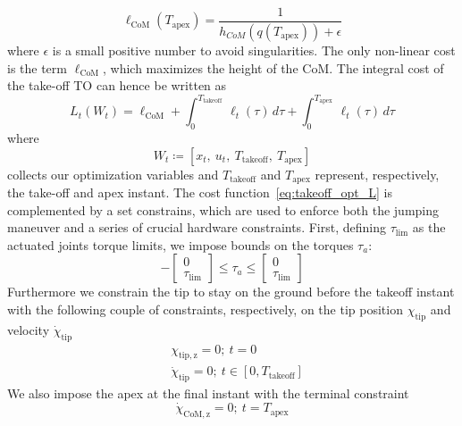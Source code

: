 \begin{equation}\label{eq:max_com}
\ell_{\mathrm{CoM}}(T_{\mathrm{apex}}) = \dfrac{1}{h_{CoM}(q(T_{\mathrm{apex}})) + \epsilon}
\end{equation}
where $\epsilon$ is a small positive number to avoid singularities.
The only non-linear cost is the term $\ell_{\mathrm{CoM}}$, which maximizes the height of the CoM. The integral cost of the take-off TO can hence be written as
\begin{dmath}\label{eq:takeoff_opt_L}
    L_{t} \left( W_t\right) = \ell_{\mathrm{CoM}} + \int_{0}^{T_{\mathrm{takeoff}}}\,\ell_{t}(\tau)\,d\tau + \int_{0}^{T_{\mathrm{apex}}}\,\ell_{t}(\tau)\,d\tau
\end{dmath}
where
\begin{equation}\label{takeoff_opt:opt_vars}
W_t \coloneqq \left[x_t,~u_t,~T_{\mathrm{takeoff}},~T_{\mathrm{apex}}\right]
\end{equation} 
collects our optimization variables and $T_{\mathrm{takeoff}}$ and $T_{\mathrm{apex}}$ represent, respectively, the take-off and apex instant. 
The cost function~\eqref{eq:takeoff_opt_L} is complemented by a set constrains, which are used to  enforce both the jumping maneuver and a series of crucial hardware constraints. First, defining $\tau_{\mathrm{lim}}$ as the actuated joints torque limits, we impose bounds on the torques $\tau_a$:
\begin{equation}\label{eq:tau_lims}
- \begin{bmatrix}
0\\
\tau_{\mathrm{lim}}
\end{bmatrix} \leq \tau_a \leq \begin{bmatrix}
0\\
\tau_{\mathrm{lim}}
\end{bmatrix}
\end{equation}
Furthermore we constrain the tip to stay on the ground before the takeoff instant with the following couple of constraints, respectively, on the tip position $\chi_{\mathrm{tip}}$ and velocity $\dot{\chi}_{\mathrm{tip}}$
\begin{eqnarray}
&\chi_{\mathrm{tip, z}} = 0 \label{eq:tip_on_ground}\label{eq:tip_on_ground_vel};~t = 0\\
&\dot{\chi}_{\mathrm{tip}} = 0;~t\in\left[0, T_{\mathrm{takeoff}}\right]
\end{eqnarray}
We also impose the apex at the final instant with the terminal constraint
\begin{equation}\label{eq:apex_com}
\dot{\chi}_{\mathrm{CoM, z}} = 0;~t = T_{\mathrm{apex}}
\end{equation}
